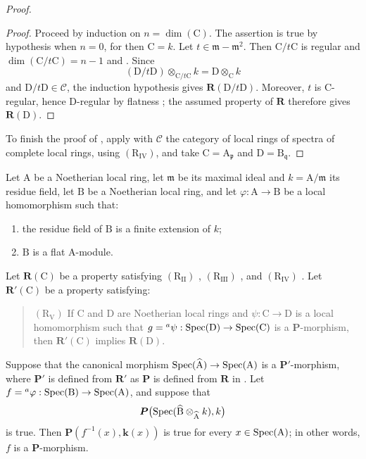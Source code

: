 \begin{proof}
\begin{proof}
Proceed by induction on $n=\dim(\mathrm{C})$. The assertion is true by hypothesis when $n=0$, for then $\mathrm{C}=k$. Let $t\in\mathfrak{m}-\mathfrak{m}^2$. Then $\mathrm{C}/t\mathrm{C}$ is regular and $\dim(\mathrm{C}/t\mathrm{C})=n-1$  and . Since
\[
  (\mathrm{D}/t\mathrm{D})\otimes_{\mathrm{C}/t\mathrm{C}}k
  =\mathrm{D}\otimes_\mathrm{C}k
\]
and $\mathrm{D}/t\mathrm{D}\in\mathcal{C}$, the induction hypothesis gives $\boldsymbol{R}(\mathrm{D}/t\mathrm{D})$. Moreover, $t$ is $\mathrm{C}$-regular, hence $\mathrm{D}$-regular by flatness ; the assumed property of $\boldsymbol{R}$ therefore gives $\boldsymbol{R}(\mathrm{D})$.
\end{proof}

To finish the proof of , apply  with $\mathcal{C}$ the category of local rings of spectra of complete local rings, using $(\mathrm{R}_{\mathrm{IV}})$, and take $\mathrm{C}=\mathrm{A}_\mathfrak{p}$ and $\mathrm{D}=\mathrm{B}_\mathfrak{q}$.
\end{proof}

\begin{corollary}[7.5.2]
\label{IV.7.5.2}
Let $\mathrm{A}$ be a Noetherian local ring, let $\mathfrak{m}$ be its maximal ideal and $k=\mathrm{A}/\mathfrak{m}$ its residue field, let $\mathrm{B}$ be a Noetherian local ring, and let $\varphi:\mathrm{A}\to\mathrm{B}$ be a local homomorphism such that:
\begin{enumerate}[label=(\roman*)]
  \item the residue field of $\mathrm{B}$ is a finite extension of $k$;
  \item $\mathrm{B}$ is a flat $\mathrm{A}$-module.
\end{enumerate}
Let $\boldsymbol{R}(\mathrm{C})$ be a property satisfying $(\mathrm{R}_{\mathrm{II}})$ , $(\mathrm{R}_{\mathrm{III}})$ , and $(\mathrm{R}_{\mathrm{IV}})$ . Let $\boldsymbol{R}'(\mathrm{C})$ be a property satisfying:
\begin{quote}
$(\mathrm{R}_{\mathrm{V}})$ If $\mathrm{C}$ and $\mathrm{D}$ are Noetherian local rings and $\psi:\mathrm{C}\to\mathrm{D}$ is a local homomorphism such that $g={}^a\psi:\operatorname{Spec}(\mathrm{D})\to\operatorname{Spec}(\mathrm{C})$ is a $\boldsymbol{P}$-morphism, then $\boldsymbol{R}'(\mathrm{C})$ implies $\boldsymbol{R}(\mathrm{D})$.
\end{quote}
Suppose that the canonical morphism $\operatorname{Spec}(\widehat{\mathrm{A}})\to\operatorname{Spec}(\mathrm{A})$ is a $\boldsymbol{P}'$-morphism, where $\boldsymbol{P}'$ is defined from $\boldsymbol{R}'$ as $\boldsymbol{P}$ is defined from $\boldsymbol{R}$ in . Let $f={}^a\varphi:\operatorname{Spec}(\mathrm{B})\to\operatorname{Spec}(\mathrm{A})$, and suppose that
\[
  \boldsymbol{P}\bigl(\operatorname{Spec}(\widehat{\mathrm{B}}\otimes_{\widehat{\mathrm{A}}}k),k\bigr)
\]
is true. Then $\boldsymbol{P}(f^{-1}(x),\boldsymbol{k}(x))$ is true for every $x\in\operatorname{Spec}(\mathrm{A})$; in other words, $f$ is a $\boldsymbol{P}$-morphism.
\end{corollary}

